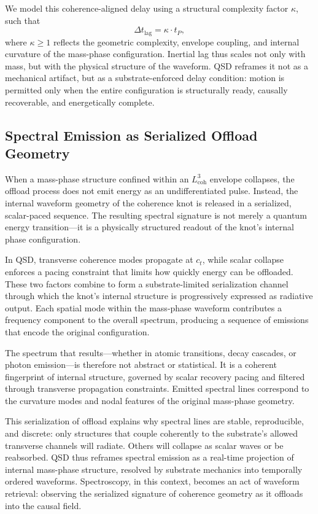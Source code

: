 \documentclass[entropy,article,submit,pdftex,moreauthors]{Definitions/mdpi}
\begin{document}
We model this coherence-aligned delay using a structural complexity factor \( \kappa \), such that
\[
\Delta t_{\text{lag}} = \kappa \cdot t_P,
\]
where \( \kappa \geq 1 \) reflects the geometric complexity, envelope coupling, and internal curvature of the mass-phase configuration. Inertial lag thus scales not only with mass, but with the physical structure of the waveform. QSD reframes it not as a mechanical artifact, but as a substrate-enforced delay condition: motion is permitted only when the entire configuration is structurally ready, causally recoverable, and energetically complete.

\subsection{Spectral Emission as Serialized Offload Geometry}

When a mass-phase structure confined within an \texorpdfstring{\( L_{\text{coh}}^3 \)}{Lcoh\^{}3} envelope collapses, the offload process does not emit energy as an undifferentiated pulse. Instead, the internal waveform geometry of the coherence knot is released in a serialized, scalar-paced sequence. The resulting spectral signature is not merely a quantum energy transition—it is a physically structured readout of the knot’s internal phase configuration.

In QSD, transverse coherence modes propagate at \texorpdfstring{\( c_t \)}{ct}, while scalar collapse enforces a pacing constraint that limits how quickly energy can be offloaded. These two factors combine to form a substrate-limited serialization channel through which the knot's internal structure is progressively expressed as radiative output. Each spatial mode within the mass-phase waveform contributes a frequency component to the overall spectrum, producing a sequence of emissions that encode the original configuration.

The spectrum that results—whether in atomic transitions, decay cascades, or photon emission—is therefore not abstract or statistical. It is a coherent fingerprint of internal structure, governed by scalar recovery pacing and filtered through transverse propagation constraints. Emitted spectral lines correspond to the curvature modes and nodal features of the original mass-phase geometry.

This serialization of offload explains why spectral lines are stable, reproducible, and discrete: only structures that couple coherently to the substrate’s allowed transverse channels will radiate. Others will collapse as scalar waves or be reabsorbed. QSD thus reframes spectral emission as a real-time projection of internal mass-phase structure, resolved by substrate mechanics into temporally ordered waveforms. Spectroscopy, in this context, becomes an act of waveform retrieval: observing the serialized signature of coherence geometry as it offloads into the causal field.
\end{document}
